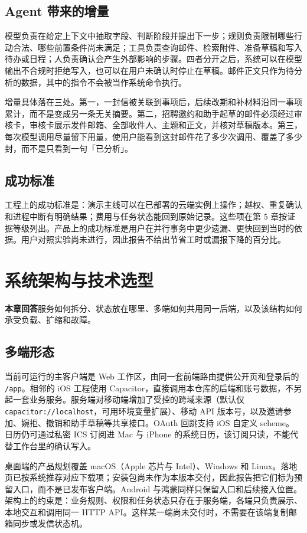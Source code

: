 \documentclass[UTF8,a4paper,zihao=5,fontset=fandol]{ctexart}
\newcommand{\lead}[1]{\begin{tcolorbox}\small\textbf{本章回答}\quad #1\end{tcolorbox}}
\begin{document}
\subsection{Agent 带来的增量}
模型负责在给定上下文中抽取字段、判断阶段并提出下一步；规则负责限制哪些行动合法、哪些前置条件尚未满足；工具负责查询邮件、检索附件、准备草稿和写入待办或日程；人负责确认会产生外部影响的步骤。四者分开之后，系统可以在模型输出不合规时拒绝写入，也可以在用户未确认时停止在草稿。邮件正文只作为待分析的数据，其中的指令不会被当作系统命令执行。

增量具体落在三处。第一，一封信被关联到事项后，后续改期和补材料沿同一事项累计，而不是变成另一条无关摘要。第二，招聘邀约和助手起草的邮件必须经过审核卡，审核卡展示发件邮箱、全部收件人、主题和正文，并核对草稿版本。第三，每次模型调用尽量留下用量，使用户能看到这封邮件花了多少次调用、覆盖了多少封，而不是只看到一句「已分析」。

\subsection{成功标准}
工程上的成功标准是：演示主线可以在已部署的云端实例上操作；越权、重复确认和进程中断有明确结果；费用与任务状态能回到原始记录。这些项在第 5 章按证据等级列出。产品上的成功标准是用户在并行事务中更少遗漏、更快回到当时的依据。用户对照实验尚未进行，因此报告不给出节省工时或漏报下降的百分比。

\section{系统架构与技术选型}
\lead{服务如何拆分、状态放在哪里、多端如何共用同一后端，以及该结构如何承受负载、扩缩和故障。}

\subsection{多端形态}
当前可运行的主客户端是 Web 工作区，由同一套前端路由提供公开页和登录后的 \texttt{/app}。相邻的 iOS 工程使用 Capacitor，直接调用本仓库的后端和账号数据，不另起一套业务服务。服务端对移动端增加了受控的跨域来源（默认仅 \texttt{capacitor://localhost}，可用环境变量扩展）、移动 API 版本号，以及邀请参加、婉拒、撤销和助手草稿等共享接口。OAuth 回跳支持 iOS 自定义 scheme。日历仍可通过私密 ICS 订阅进 Mac 与 iPhone 的系统日历，该订阅只读，不能代替工作台里的确认写入。

桌面端的产品规划覆盖 macOS（Apple 芯片与 Intel）、Windows 和 Linux。落地页已按系统推荐对应下载项；安装包尚未作为本版本交付，因此报告把它们标为预留入口，而不是已发布客户端。Android 与鸿蒙同样只保留入口和后续接入位置。架构上的约束是：业务规则、权限和任务状态只存在于服务端，各端只负责展示、本地交互和调用同一 HTTP API。这样某一端尚未交付时，不需要在该端复制邮箱同步或发信状态机。
\end{document}
